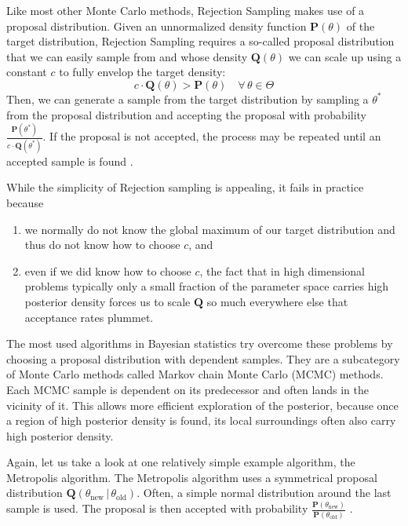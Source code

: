 \documentclass[12pt, a4paper]{report}
\begin{document}
Like most other Monte Carlo methods, Rejection Sampling makes use of a proposal distribution.
Given an unnormalized density function $\mathbf{P}(\theta)$ of the target distribution, Rejection Sampling requires a so-called proposal distribution that we can easily sample from and whose density $\mathbf{Q}(\theta)$ we can scale up using a constant $c$ to fully envelop the target density:
\begin{equation}
    c \cdot \mathbf{Q}(\theta) > \mathbf{P}(\theta) \quad \forall \, \theta \in \Theta \nonumber
\end{equation}
Then, we can generate a sample from the target distribution by sampling a $\theta^*$ from the proposal distribution and accepting the proposal with probability $\frac{\mathbf{P}(\theta^*)}{c \cdot \mathbf{Q}(\theta^*)}$.
If the proposal is not accepted, the process may be repeated until an accepted sample is found \cite[364]{mckay}.

While the simplicity of Rejection sampling is appealing, it fails in practice because
\begin{enumerate}
    \item we normally do not know the global maximum of our target distribution and thus do not know how to choose $c$, and
    \item even if we did know how to choose $c$, the fact that in high dimensional problems typically only a small fraction of the parameter space carries high posterior density forces us to scale $\mathbf{Q}$ so much everywhere else that acceptance rates plummet.
\end{enumerate}
 
The most used algorithms in Bayesian statistics try overcome these problems by choosing a proposal distribution with dependent samples.
They are a subcategory of Monte Carlo methods called Markov chain Monte Carlo (MCMC) methods.
Each MCMC sample is dependent on its predecessor and often lands in the vicinity of it.
This allows more efficient exploration of the posterior, because once a region of high posterior density is found, its local surroundings often also carry high posterior density. 

Again, let us take a look at one relatively simple example algorithm, the Metropolis algorithm.
The Metropolis algorithm uses a symmetrical proposal distribution $\mathbf{Q}(\theta_{\textrm{new}} \,|\, \theta_{\textrm{old}})$.
Often, a simple normal distribution around the last sample is used.
The proposal is then accepted with probability $\frac{\mathbf{P}(\theta_{\textrm{new}})}{\mathbf{P}(\theta_{\textrm{old}})}$ \cite[p. 365f.]{mckay}.
\end{document}

